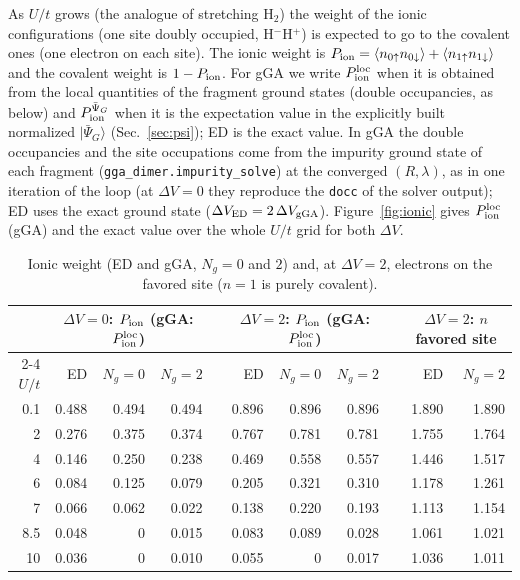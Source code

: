 \documentclass[11pt]{article}
\newcommand{\Ng}{N_{g}}
\newcommand{\dV}{\Delta V}
\begin{document}
As $U/t$ grows (the analogue of stretching H$_2$) the weight of the ionic configurations (one site doubly occupied, H$^-$H$^+$) is expected to go to the covalent ones (one electron on each site).
The ionic weight is $P_{\rm ion}=\langle n_{0\uparrow}n_{0\downarrow}\rangle+\langle n_{1\uparrow}n_{1\downarrow}\rangle$ and the covalent weight is $1-P_{\rm ion}$. For gGA we write $P_{\rm ion}^{\rm loc}$ when it is obtained from the local quantities of the fragment ground states (double occupancies, as below) and $P_{\rm ion}^{\bar\Psi_G}$ when it is the expectation value in the explicitly built normalized $|\bar\Psi_G\rangle$ (Sec.~\ref{sec:psi}); ED is the exact value. In gGA the double occupancies and the site
occupations come from the impurity ground state of each fragment (\texttt{gga\_dimer.impurity\_solve}) at the converged $(R,\lambda)$, as in one iteration of the loop (at $\dV=0$ they reproduce the \texttt{docc} of the solver output);
ED uses the exact ground state ($\Delta V_{\rm ED}=2\,\Delta V_{\rm gGA}$). Figure~\ref{fig:ionic} gives $P_{\rm ion}^{\rm loc}$ (gGA) and the exact value over the whole $U/t$ grid for both $\dV$.
\begin{table}[H]
\centering\small
\begin{tabular}{r rrr c rrr c rr}
\toprule
 & \multicolumn{3}{c}{$\dV=0$: $P_{\rm ion}$ (gGA: $P_{\rm ion}^{\rm loc}$)} & & \multicolumn{3}{c}{$\dV=2$: $P_{\rm ion}$ (gGA: $P_{\rm ion}^{\rm loc}$)} & & \multicolumn{2}{c}{$\dV=2$: $n$ favored site}\\
\cmidrule{2-4}\cmidrule{6-8}\cmidrule{10-11}
$U/t$ & ED & $\Ng=0$ & $\Ng=2$ & & ED & $\Ng=0$ & $\Ng=2$ & & ED & $\Ng=2$\\
\midrule
0.1 & 0.488 & 0.494 & 0.494 & & 0.896 & 0.896 & 0.896 & & 1.890 & 1.890\\
2   & 0.276 & 0.375 & 0.374 & & 0.767 & 0.781 & 0.781 & & 1.755 & 1.764\\
4   & 0.146 & 0.250 & 0.238 & & 0.469 & 0.558 & 0.557 & & 1.446 & 1.517\\
6   & 0.084 & 0.125 & 0.079 & & 0.205 & 0.321 & 0.310 & & 1.178 & 1.261\\
7   & 0.066 & 0.062 & 0.022 & & 0.138 & 0.220 & 0.193 & & 1.113 & 1.154\\
8.5 & 0.048 & 0     & 0.015 & & 0.083 & 0.089 & 0.028 & & 1.061 & 1.021\\
10  & 0.036 & 0     & 0.010 & & 0.055 & 0     & 0.017 & & 1.036 & 1.011\\
\bottomrule
\end{tabular}
\caption{Ionic weight (ED and gGA, $\Ng=0$ and $2$) and, at $\dV=2$, electrons on the favored site ($n=1$ is purely covalent).}
\label{tab:ionic}
\end{table}
\end{document}
